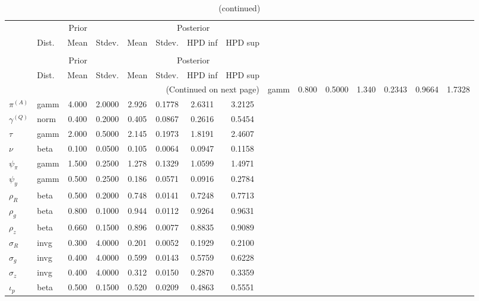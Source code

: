  
\begin{center}
\begin{longtable}{llcccccc} 
\caption{Results from Metropolis-Hastings (parameters)}
 \label{Table:MHPosterior:1}\\
\toprule 
  & \multicolumn{3}{c}{Prior}  &  \multicolumn{4}{c}{Posterior} \\
  \cmidrule(r{.75em}){2-4} \cmidrule(r{.75em}){5-8}
  & Dist. & Mean  & Stdev. & Mean & Stdev. & HPD inf & HPD sup\\
\midrule \endfirsthead 
\caption{(continued)}\\\toprule 
  & \multicolumn{3}{c}{Prior}  &  \multicolumn{4}{c}{Posterior} \\
  \cmidrule(r{.75em}){2-4} \cmidrule(r{.75em}){5-8}
  & Dist. & Mean  & Stdev. & Mean & Stdev. & HPD inf & HPD sup\\
\midrule \endhead 
\bottomrule \multicolumn{8}{r}{(Continued on next page)} \endfoot 
\bottomrule \endlastfoot 
${r_{A}}$ & gamm &   0.800 & 0.5000 &   1.340& 0.2343 &  0.9664 &  1.7328 \\ 
${\pi^{(A)}}$ & gamm &   4.000 & 2.0000 &   2.926& 0.1778 &  2.6311 &  3.2125 \\ 
${\gamma^{(Q)}}$ & norm &   0.400 & 0.2000 &   0.405& 0.0867 &  0.2616 &  0.5454 \\ 
${\tau}$ & gamm &   2.000 & 0.5000 &   2.145& 0.1973 &  1.8191 &  2.4607 \\ 
${\nu}$ & beta &   0.100 & 0.0500 &   0.105& 0.0064 &  0.0947 &  0.1158 \\ 
${\psi_\pi}$ & gamm &   1.500 & 0.2500 &   1.278& 0.1329 &  1.0599 &  1.4971 \\ 
${\psi_y}$ & gamm &   0.500 & 0.2500 &   0.186& 0.0571 &  0.0916 &  0.2784 \\ 
${\rho_R}$ & beta &   0.500 & 0.2000 &   0.748& 0.0141 &  0.7248 &  0.7713 \\ 
${\rho_{g}}$ & beta &   0.800 & 0.1000 &   0.944& 0.0112 &  0.9264 &  0.9631 \\ 
${\rho_z}$ & beta &   0.660 & 0.1500 &   0.896& 0.0077 &  0.8835 &  0.9089 \\ 
${\sigma_R}$ & invg &   0.300 & 4.0000 &   0.201& 0.0052 &  0.1929 &  0.2100 \\ 
${\sigma_{g}}$ & invg &   0.400 & 4.0000 &   0.599& 0.0143 &  0.5759 &  0.6228 \\ 
${\sigma_z}$ & invg &   0.400 & 4.0000 &   0.312& 0.0150 &  0.2870 &  0.3359 \\ 
${\iota_p}$ & beta &   0.500 & 0.1500 &   0.520& 0.0209 &  0.4863 &  0.5551 \\ 
\end{longtable}
 \end{center}
